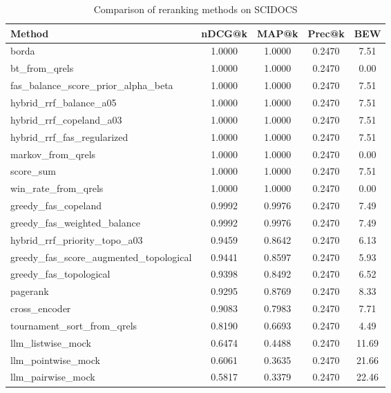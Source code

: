 \begin{table}[ht]
\centering
\caption{Comparison of reranking methods on SCIDOCS}
\label{tab:modern_baselines_scidocs}
\begin{tabular}{lcccc}
\toprule
Method & nDCG@k & MAP@k & Prec@k & BEW \\
\midrule
borda & 1.0000 & 1.0000 & 0.2470 & 7.51 \\
bt\_from\_qrels & 1.0000 & 1.0000 & 0.2470 & 0.00 \\
fas\_balance\_score\_prior\_alpha\_beta & 1.0000 & 1.0000 & 0.2470 & 7.51 \\
hybrid\_rrf\_balance\_a05 & 1.0000 & 1.0000 & 0.2470 & 7.51 \\
hybrid\_rrf\_copeland\_a03 & 1.0000 & 1.0000 & 0.2470 & 7.51 \\
hybrid\_rrf\_fas\_regularized & 1.0000 & 1.0000 & 0.2470 & 7.51 \\
markov\_from\_qrels & 1.0000 & 1.0000 & 0.2470 & 0.00 \\
score\_sum & 1.0000 & 1.0000 & 0.2470 & 7.51 \\
win\_rate\_from\_qrels & 1.0000 & 1.0000 & 0.2470 & 0.00 \\
greedy\_fas\_copeland & 0.9992 & 0.9976 & 0.2470 & 7.49 \\
greedy\_fas\_weighted\_balance & 0.9992 & 0.9976 & 0.2470 & 7.49 \\
hybrid\_rrf\_priority\_topo\_a03 & 0.9459 & 0.8642 & 0.2470 & 6.13 \\
greedy\_fas\_score\_augmented\_topological & 0.9441 & 0.8597 & 0.2470 & 5.93 \\
greedy\_fas\_topological & 0.9398 & 0.8492 & 0.2470 & 6.52 \\
pagerank & 0.9295 & 0.8769 & 0.2470 & 8.33 \\
cross\_encoder & 0.9083 & 0.7983 & 0.2470 & 7.71 \\
tournament\_sort\_from\_qrels & 0.8190 & 0.6693 & 0.2470 & 4.49 \\
llm\_listwise\_mock & 0.6474 & 0.4488 & 0.2470 & 11.69 \\
llm\_pointwise\_mock & 0.6061 & 0.3635 & 0.2470 & 21.66 \\
llm\_pairwise\_mock & 0.5817 & 0.3379 & 0.2470 & 22.46 \\
\bottomrule
\end{tabular}
\end{table}